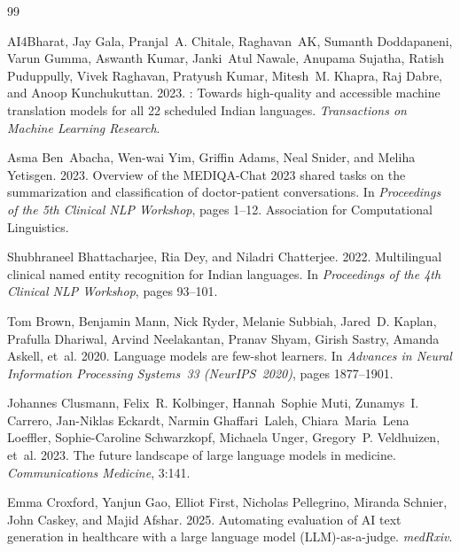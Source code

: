 \documentclass[10pt,twocolumn]{article}
\begin{document}
\begin{thebibliography}{99}

AI4Bharat, Jay Gala, Pranjal~A. Chitale, Raghavan~AK, Sumanth Doddapaneni,
  Varun Gumma, Aswanth Kumar, Janki~Atul Nawale, Anupama Sujatha, Ratish
  Puduppully, Vivek Raghavan, Pratyush Kumar, Mitesh~M. Khapra, Raj Dabre,
  and Anoop Kunchukuttan. 2023.
: Towards high-quality and accessible machine
  translation models for all 22 scheduled {Indian} languages.
\newblock \textit{Transactions on Machine Learning Research}.

Asma Ben~Abacha, Wen-wai Yim, Griffin Adams, Neal Snider, and Meliha
  Yetisgen. 2023.
\newblock Overview of the {MEDIQA-Chat} 2023 shared tasks on the
  summarization and classification of doctor-patient conversations.
\newblock In \textit{Proceedings of the 5th Clinical NLP Workshop}, pages
  1--12. Association for Computational Linguistics.

Shubhraneel Bhattacharjee, Ria Dey, and Niladri Chatterjee. 2022.
\newblock Multilingual clinical named entity recognition for {Indian}
  languages.
\newblock In \textit{Proceedings of the 4th Clinical NLP Workshop}, pages
  93--101.

Tom Brown, Benjamin Mann, Nick Ryder, Melanie Subbiah, Jared~D. Kaplan,
  Prafulla Dhariwal, Arvind Neelakantan, Pranav Shyam, Girish Sastry, Amanda
  Askell, et~al. 2020.
\newblock Language models are few-shot learners.
\newblock In \textit{Advances in Neural Information Processing Systems~33
  (NeurIPS~2020)}, pages 1877--1901.

Johannes Clusmann, Felix~R. Kolbinger, Hannah~Sophie Muti, Zunamys~I.
  Carrero, Jan-Niklas Eckardt, Narmin Ghaffari~Laleh, Chiara~Maria~Lena
  Loeffler, Sophie-Caroline Schwarzkopf, Michaela Unger, Gregory~P. Veldhuizen,
  et~al. 2023.
\newblock The future landscape of large language models in medicine.
\newblock \textit{Communications Medicine}, 3:141.

Emma Croxford, Yanjun Gao, Elliot First, Nicholas Pellegrino, Miranda
  Schnier, John Caskey, and Majid Afshar. 2025.
\newblock Automating evaluation of {AI} text generation in healthcare with a
  large language model ({LLM})-as-a-judge.
\newblock \textit{medRxiv}.


\end{thebibliography}
\end{document}
